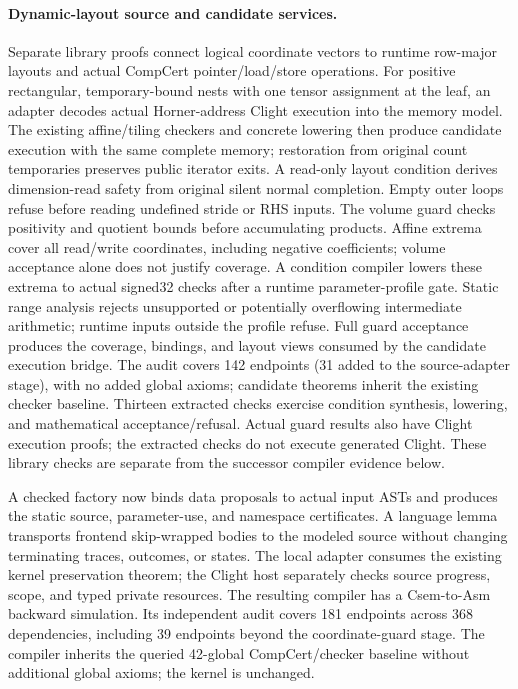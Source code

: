 \paragraph{Dynamic-layout source and candidate services.}
Separate library proofs connect logical coordinate vectors to runtime row-major
layouts and actual CompCert pointer/load/store operations. For positive
rectangular, temporary-bound nests with one tensor assignment at the leaf, an
adapter decodes actual Horner-address Clight execution into the memory model.
The existing affine/tiling checkers and concrete lowering then produce candidate
execution with the same complete memory; restoration from original count
temporaries preserves public iterator exits. A read-only layout condition derives
dimension-read safety from original silent normal completion. Empty outer loops
refuse before reading undefined stride or RHS inputs. The volume guard checks
positivity and quotient bounds before accumulating products. Affine extrema
cover all read/write coordinates, including negative coefficients; volume
acceptance alone does not justify coverage. A condition compiler lowers these
extrema to actual signed32 checks after a runtime parameter-profile gate.
Static range analysis rejects unsupported or potentially overflowing intermediate
arithmetic; runtime inputs outside the profile refuse. Full guard acceptance
produces the coverage, bindings, and layout views consumed by the candidate
execution bridge. The audit covers 142 endpoints (31 added to the source-adapter
stage), with no added global axioms; candidate theorems inherit the existing
checker baseline. Thirteen extracted checks exercise condition synthesis,
lowering, and mathematical acceptance/refusal. Actual guard results also have
Clight execution proofs; the extracted checks do not execute generated Clight.
These library checks are separate from the successor compiler evidence below.

A checked factory now binds data proposals to actual input ASTs and produces
the static source, parameter-use, and namespace certificates. A language lemma
transports frontend skip-wrapped bodies to the modeled source without changing
terminating traces, outcomes, or states. The local adapter consumes the existing
kernel preservation theorem; the Clight host separately checks source progress,
scope, and typed private resources. The resulting compiler has a Csem-to-Asm
backward simulation. Its independent audit covers 181 endpoints across 368
dependencies, including 39 endpoints beyond the coordinate-guard stage. The
compiler inherits the queried 42-global CompCert/checker baseline without
additional global axioms; the kernel is unchanged.

